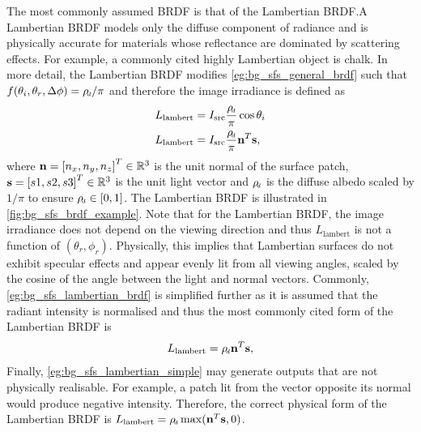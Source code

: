 The most commonly assumed BRDF is that of the Lambertian BRDF.\@ A Lambertian
BRDF models only the diffuse component of radiance and is physically accurate
for materials whose reflectance are dominated by scattering effects. For
example, a commonly cited highly Lambertian object is chalk. In more
detail, the Lambertian BRDF modifies \cref{eg:bg_sfs_general_brdf} such that
$f(\theta_i,\theta_r, \Delta \phi) = \rho_{\smallsub{d}} / \pi$ and therefore
the image irradiance is defined as
\begin{align}\label{eg:bg_sfs_lambertian_brdf}
	L_{\operatorname{lambert}} &= I_{\operatorname{src}} \frac{\rho_{\smallsub{d}}}{\pi} \cos{\theta_i} \\
	L_{\operatorname{lambert}} &= I_{\operatorname{src}} \frac{\rho_{\smallsub{d}}}{\pi} \bb{n}^T \bb{s},
\end{align}
where $\boldsymbol{\mathbf{n}} = {[n_x, n_y, n_z]}^T \in \mathbb{R}^{3}$ is the unit normal of the surface patch,
$\boldsymbol{\mathbf{s}} = {[s1, s2, s3]}^T \in \mathbb{R}^{3}$ is the unit
light vector and $\rho_{\smallsub{d}}$ is the diffuse albedo scaled by $1/\pi$
to ensure $\rho_{\smallsub{d}} \in [0, 1]$. The Lambertian BRDF is illustrated
in \cref{fig:bg_sfs_brdf_example}. Note that for the Lambertian BRDF, the image
irradiance does not depend on the viewing direction and thus
$L_{\operatorname{lambert}}$ is not a function of $(\theta_r,\phi_r)$.
Physically, this implies that Lambertian surfaces do not exhibit specular
effects and appear evenly lit from all viewing angles, scaled by the cosine
of the angle between the light and normal vectors. Commonly,
\cref{eg:bg_sfs_lambertian_brdf} is simplified further as it is assumed that the
radiant intensity is normalised and thus the most commonly cited form of the
Lambertian BRDF is
\begin{align}\label{eg:bg_sfs_lambertian_simple}
	L_{\operatorname{lambert}} = \rho_{\smallsub{d}} \bb{n}^T \bb{s},
\end{align}
Finally, \cref{eg:bg_sfs_lambertian_simple} may generate outputs that are
not physically realisable. For example, a patch lit from the vector opposite
its normal would produce negative intensity. Therefore, the correct physical
form of the Lambertian BRDF is
$L_{\operatorname{lambert}} = \rho_{\smallsub{d}} \max(\bb{n}^T \bb{s}, 0)$.
